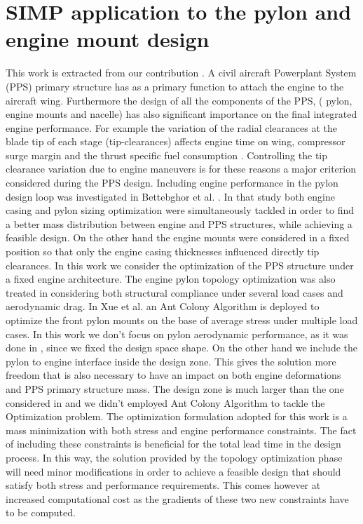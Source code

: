 \section{SIMP application to the pylon and engine mount design}
\label{SIMP_application}
This work is extracted from our contribution \cite{coniglio2019enginepylon}.
A civil aircraft Powerplant System (PPS) primary structure has as a primary function to attach the engine to the aircraft wing. Furthermore the design of all the components of the PPS, ( pylon, engine mounts and nacelle) has also significant importance on the final integrated engine performance.
For example the variation of the radial clearances at the blade tip of each stage (tip-clearances) affects engine time on wing, compressor surge margin and the thrust specific fuel consumption \cite{lattime2002turbine,benito20083d}. Controlling the tip clearance variation due to engine maneuvers is for these reasons a major criterion considered during the PPS design. Including engine performance in the pylon design loop was investigated in Bettebghor et al. \cite{bettebghor2013bi}. In that study both engine casing and pylon sizing optimization were simultaneously tackled in order to find a better mass distribution between engine and PPS structures, while achieving a feasible design. On the other hand the engine mounts were considered in a fixed position so that only the engine casing thicknesses influenced directly tip clearances.
In this work we consider the optimization of the PPS structure under a fixed engine architecture.
 The engine pylon topology optimization was also treated in \cite{remouchamps2011application} considering both structural compliance under several load cases and aerodynamic drag.
 In Xue et al. \cite{xue2012structural} an Ant Colony Algorithm is deployed to optimize the front pylon mounts on the base of average stress under multiple load cases.
 In this work we don't focus on pylon aerodynamic performance, as it was done in \cite{remouchamps2011application}, since we fixed the design space shape. On the other hand we include the pylon to engine interface inside the design zone. This gives the solution more freedom that is also necessary to have an impact on both engine deformations and PPS primary structure mass. The design zone is much larger than the one considered in \cite{xue2012structural} and we didn't employed Ant Colony Algorithm to tackle the Optimization problem.
 The optimization formulation adopted for this work is a mass minimization with both stress and engine performance constraints. The fact of including these constraints is beneficial for the total lead time in the design process. In this way, the solution provided by the topology optimization phase will need minor modifications in order to achieve a feasible design that should satisfy both stress and performance requirements. This comes however at increased computational cost as the gradients of these two new constraints have to be computed.\\
